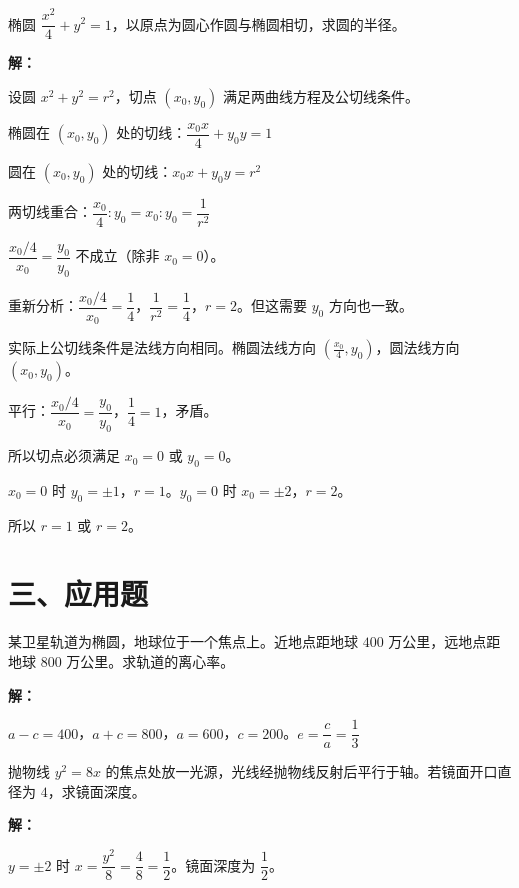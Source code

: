 \documentclass[12pt, a4paper]{ctexart}
\begin{document}
\begin{examplebox}[【例题12】综合——椭圆与圆的位置关系]
椭圆 $\dfrac{x^2}{4}+y^2=1$，以原点为圆心作圆与椭圆相切，求圆的半径。

\textbf{解：}

设圆 $x^2+y^2=r^2$，切点 $(x_0,y_0)$ 满足两曲线方程及公切线条件。

椭圆在 $(x_0,y_0)$ 处的切线：$\dfrac{x_0 x}{4}+y_0 y=1$

圆在 $(x_0,y_0)$ 处的切线：$x_0 x+y_0 y=r^2$

两切线重合：$\dfrac{x_0}{4}:y_0=x_0:y_0=\dfrac{1}{r^2}$

$\dfrac{x_0/4}{x_0}=\dfrac{y_0}{y_0}$ 不成立（除非 $x_0=0$）。

重新分析：$\dfrac{x_0/4}{x_0}=\dfrac{1}{4}$，$\dfrac{1}{r^2}=\dfrac{1}{4}$，$r=2$。但这需要 $y_0$ 方向也一致。

实际上公切线条件是法线方向相同。椭圆法线方向 $(\frac{x_0}{4},y_0)$，圆法线方向 $(x_0,y_0)$。

平行：$\dfrac{x_0/4}{x_0}=\dfrac{y_0}{y_0}$，$\dfrac{1}{4}=1$，矛盾。

所以切点必须满足 $x_0=0$ 或 $y_0=0$。

$x_0=0$ 时 $y_0=\pm 1$，$r=1$。$y_0=0$ 时 $x_0=\pm 2$，$r=2$。

所以 $r=\boxed{1}$ 或 $r=\boxed{2}$。
\end{examplebox}

\section*{\textcolor{apppurple}{三、应用题}}

\begin{appbox}[【应用1】卫星轨道]
某卫星轨道为椭圆，地球位于一个焦点上。近地点距地球 $400$ 万公里，远地点距地球 $800$ 万公里。求轨道的离心率。

\textbf{解：}

$a-c=400$，$a+c=800$，$a=600$，$c=200$。$e=\dfrac{c}{a}=\boxed{\dfrac{1}{3}}$
\end{appbox}

\begin{appbox}[【应用2】抛物线反射镜]
抛物线 $y^2=8x$ 的焦点处放一光源，光线经抛物线反射后平行于轴。若镜面开口直径为 $4$，求镜面深度。

\textbf{解：}

$y=\pm 2$ 时 $x=\dfrac{y^2}{8}=\dfrac{4}{8}=\dfrac{1}{2}$。镜面深度为 $\boxed{\dfrac{1}{2}}$。
\end{appbox}
\end{document}
